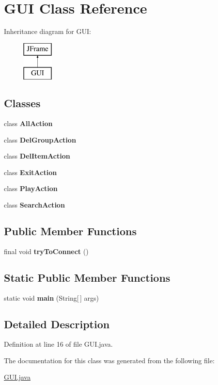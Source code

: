 \hypertarget{class_g_u_i}{}\section{G\+UI Class Reference}
\label{class_g_u_i}
Inheritance diagram for G\+UI\+:\begin{figure}[H]
\begin{center}
\leavevmode
\includegraphics[height=2.000000cm]{class_g_u_i}
\end{center}
\end{figure}
\subsection*{Classes}
\begin{DoxyCompactItemize}
\item 
class {\bfseries All\+Action}
\item 
class {\bfseries Del\+Group\+Action}
\item 
class {\bfseries Del\+Item\+Action}
\item 
class {\bfseries Exit\+Action}
\item 
class {\bfseries Play\+Action}
\item 
class {\bfseries Search\+Action}
\end{DoxyCompactItemize}
\subsection*{Public Member Functions}
\begin{DoxyCompactItemize}
\item 
\mbox{\label{class_g_u_i_aa6bbef48b3b049a6b8e880c4fbbc3bc9}} 
final void {\bfseries try\+To\+Connect} ()
\end{DoxyCompactItemize}
\subsection*{Static Public Member Functions}
\begin{DoxyCompactItemize}
\item 
\mbox{\label{class_g_u_i_a8202c223d5b25c7dd94ce70bd6a267ac}} 
static void {\bfseries main} (String\mbox{[}$\,$\mbox{]} args)
\end{DoxyCompactItemize}


\subsection{Detailed Description}


Definition at line 16 of file G\+U\+I.\+java.



The documentation for this class was generated from the following file\+:\begin{DoxyCompactItemize}
\item 
\mbox{\hyperlink{_g_u_i_8java}{G\+U\+I.\+java}}\end{DoxyCompactItemize}
